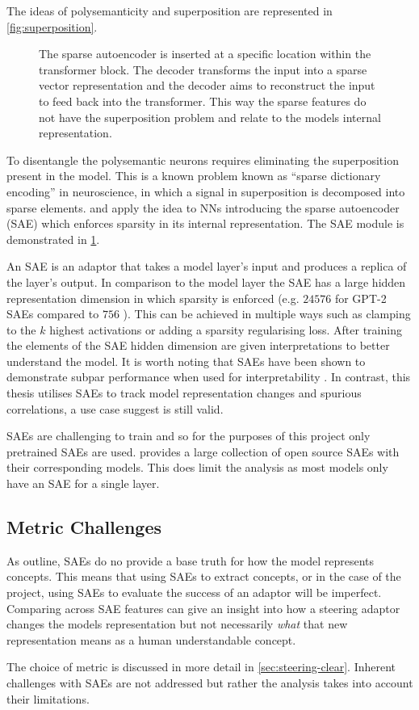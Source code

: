 The ideas of polysemanticity and superposition are represented in \cref{fig:superposition}.

\begin{figure}
    \centering
    \captionsetup{width=.9\textwidth}
    
    \caption{The sparse autoencoder is inserted at a specific location within the transformer block. The decoder transforms the input into a sparse vector representation and the decoder aims to reconstruct the input to feed back into the transformer. This way the sparse features do not have the superposition problem and relate to the models internal representation.}
    \label{fig:sae}
\end{figure}

To disentangle the polysemantic neurons requires eliminating the superposition present in the model.
This is a known problem known as ``sparse dictionary encoding'' \citep{sparse-coding} in neuroscience, in which a signal in superposition is decomposed into sparse elements.
\citet{sae-orig} and \citet{saes} apply the idea to NNs introducing the sparse autoencoder (SAE) which enforces sparsity in its internal representation.
The SAE module is demonstrated in \cref{fig:sae}.

An SAE is an adaptor that takes a model layer's input and produces a replica of the layer's output.
In comparison to the model layer the SAE has a large hidden representation dimension in which sparsity is enforced (e.g. $24576$ for GPT-2 SAEs compared to $756$ \citep{saelens}).
This can be achieved in multiple ways such as clamping to the $k$ highest activations \citep{k-sparsity} or adding a sparsity regularising loss.
After training the elements of the SAE hidden dimension are given interpretations to better understand the model.
It is worth noting that SAEs have been shown to demonstrate subpar performance when used for interpretability \citep{saes-bad}.
In contrast, this thesis utilises SAEs to track model representation changes and spurious correlations, a use case \citet{saes-bad} suggest is still valid.

SAEs are challenging to train and so for the purposes of this project only pretrained SAEs are used.
\citet{saelens} provides a large collection of open source SAEs with their corresponding models.
This does limit the analysis as most models only have an SAE for a single layer.

\subsection{Metric Challenges}

As \citet{saes-bad} outline, SAEs do no provide a base truth for how the model represents concepts.
This means that using SAEs to extract concepts, or in the case of the project, using SAEs to evaluate the success of an adaptor will be imperfect.
Comparing across SAE features can give an insight into how a steering adaptor changes the models representation but not necessarily \emph{what} that new representation means as a human understandable concept.

The choice of metric is discussed in more detail in \cref{sec:steering-clear}.
Inherent challenges with SAEs are not addressed but rather the analysis takes into account their limitations.
